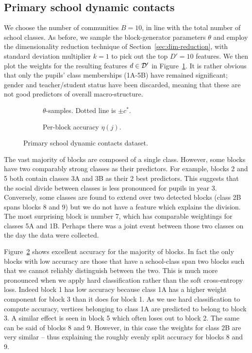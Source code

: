 \subsection{Primary school dynamic contacts}

We choose the number of communities $B=10$, in line with the total number of 
school classes. As before, we sample the block-generator parameters $\theta$ and 
employ the dimensionality reduction technique 
of Section~\ref{sec:dim-reduction},
with standard deviation multiplier $k=1$ to pick out the top $D'=10$ features. 
We then plot the weights for the resulting features $d \in \mathcal{D}'$ 
in Figure~\ref{fig:school-null}. It is rather obvious
that only the pupils' class memberships (1A-5B) have remained
significant;
gender and teacher/student status have been discarded,
meaning that these are not good predictors of overall macro-structure.
%
\begin{figure}[!h]
	\centering
	\begin{subfigure}[t]{0.45\linewidth}
		\centering
		\caption{$\theta$-samples. Dotted line is $\pm c^*$.}
		\label{fig:school-null}
	\end{subfigure}
	\begin{subfigure}[t]{0.45\linewidth}
		\centering
		\caption{Per-block accuracy $\eta(j)$.}
		\label{fig:school-accuracy}
	\end{subfigure}
	\caption{Primary school dynamic contacts dataset.}
	\label{fig:school}
\end{figure}

The vast majority of blocks are composed of a single class. 
However, some blocks have two comparably strong classes as their predictors. 
For example, blocks 2 and 5 both contain classes 3A and 3B as their 2 best predictors. 
This suggests that the social divide between classes is less pronounced 
for pupils in year 3. Conversely, some classes are found to extend over two 
detected blocks (class 2B spans blocks 8 and 9) but we do 
not have a feature which explains the division. The most surprising block 
is number 7, which has comparable weightings for classes 5A and 1B. 
Perhaps there was a joint event between those two classes on the day 
the data were collected.

Figure~\ref{fig:school-accuracy} shows excellent accuracy for the majority of blocks. In fact the only blocks with low accuracy are those that have a school-class span two blocks such that we cannot reliably distinguish between the two. This is much more pronounced when we apply hard classification rather than the soft cross-entropy loss. Indeed block 1 has low accuracy because class 1A has a higher weight component for block 3 than it does for block 1. As we use hard classification to compute accuracy, vertices belonging to class 1A are predicted to belong to block 3. A similar effect is seen in block 5 which often loses out to block 2. The same can be said of blocks 8 and 9. However, in this case the weights for class 2B are very similar -- thus explaining the roughly evenly split accuracy for blocks 8 and 9.

